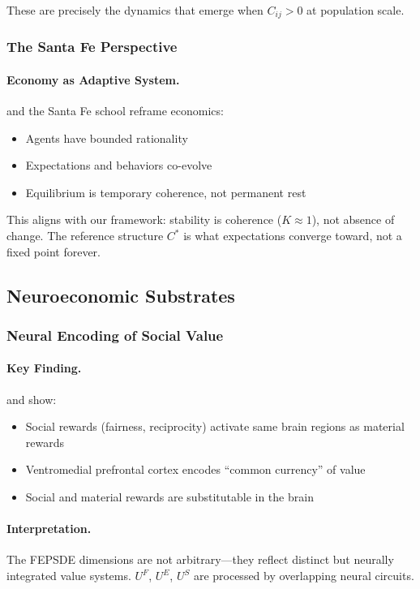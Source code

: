These are precisely the dynamics that emerge when $C_{ij} > 0$ at population scale.

\subsubsection{The Santa Fe Perspective}

\paragraph{Economy as Adaptive System.}
\citet{arthur2015} and the Santa Fe school reframe economics:
\begin{itemize}
  \item Agents have bounded rationality
  \item Expectations and behaviors co-evolve
  \item Equilibrium is temporary coherence, not permanent rest
\end{itemize}

This aligns with our framework: stability is coherence ($K \approx 1$),
not absence of change. The reference structure $C^*$ is what expectations
converge toward, not a fixed point forever.

\subsection{Neuroeconomic Substrates}

\subsubsection{Neural Encoding of Social Value}

\paragraph{Key Finding.}
\citet{rangelshadcam2008} and \citet{fehrcamerer2007} show:
\begin{itemize}
  \item Social rewards (fairness, reciprocity) activate same brain regions as material rewards
  \item Ventromedial prefrontal cortex encodes ``common currency'' of value
  \item Social and material rewards are substitutable in the brain
\end{itemize}

\paragraph{Interpretation.}
The FEPSDE dimensions are not arbitrary---they reflect distinct
but neurally integrated value systems. $U^F$, $U^E$, $U^S$ are
processed by overlapping neural circuits.

